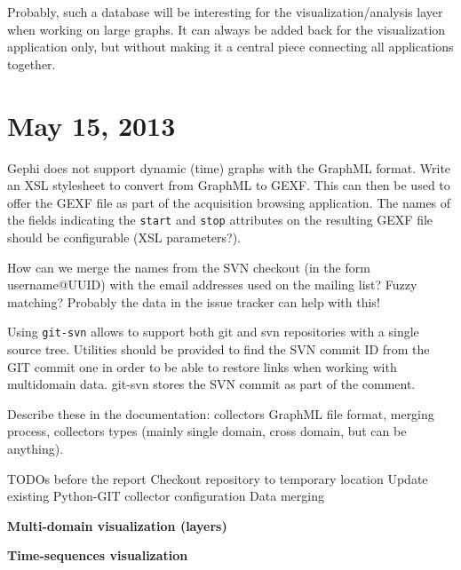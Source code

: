 Probably, such a database will be interesting for the visualization/analysis layer when working on large graphs. It can always be added back for the visualization application only, but without making it a central piece connecting all applications together.

\section{May 15, 2013}

Gephi does not support dynamic (time) graphs with the GraphML format. Write an XSL stylesheet to convert from GraphML to GEXF. This can then be used to offer the GEXF file as part of the acquisition browsing application. The names of the fields indicating the \texttt{start} and \texttt{stop} attributes on the resulting GEXF file should be configurable (XSL parameters?).

How can we merge the names from the SVN checkout (in the form username@UUID) with the email addresses used on the mailing list? Fuzzy matching? Probably the data in the issue tracker can help with this!

Using \texttt{git-svn} allows to support both git and svn repositories with a single source tree. Utilities should be provided to find the SVN commit ID from the GIT commit one in order to be able to restore links when working with multidomain data. git-svn stores the SVN commit as part of the comment.

Describe these in the documentation: collectors GraphML file format, merging process, collectors types (mainly single domain, cross domain, but can be anything).

\begin{todos}{TODOs before the report}
    \done Checkout repository to temporary location
    \done Update existing
    \done Python-GIT collector configuration
    \done Data merging
    \item \textbf{Multi-domain visualization (layers)}
    \item \textbf{Time-sequences visualization}
\end{todos}

